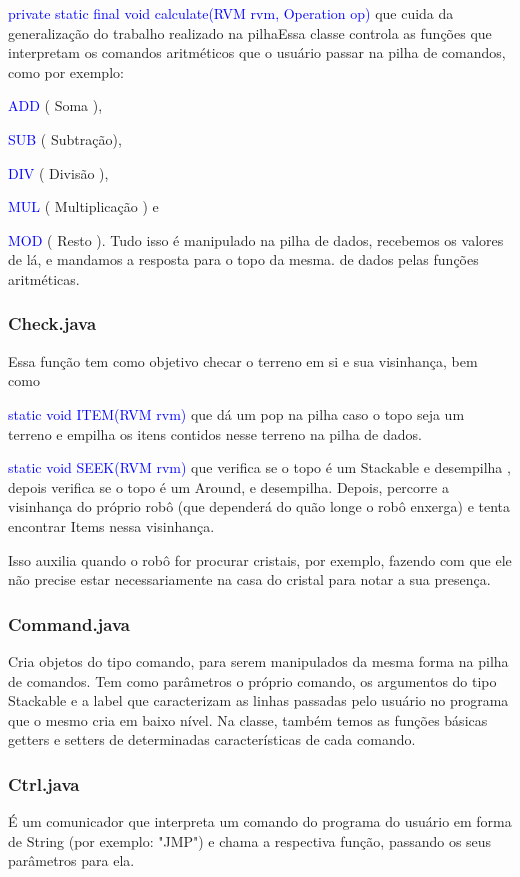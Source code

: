 \documentclass[a4paper]{article}
\begin{document}
		    {\textcolor{blue}{ private static final void 
		    calculate(RVM rvm, Operation op) }
		    que cuida da generalização do trabalho realizado 
		    na pilhaEssa classe controla as funções que interpretam
		    os comandos aritméticos que o usuário passar na
		    pilha de comandos, como por exemplo: 
		    {\textcolor{blue}{ADD} ( Soma ),
		    {\textcolor{blue}{SUB} ( Subtração),
		    {\textcolor{blue}{DIV} ( Divisão ), 
		    {\textcolor{blue}{MUL} ( Multiplicação ) e 
		    {\textcolor{blue}{MOD} ( Resto ).
		    Tudo isso é manipulado na pilha de dados,
		    recebemos os valores de lá, e mandamos a resposta
		    para o topo da mesma. de dados pelas funções aritméticas.
		        
		\subsubsection{ Check.java }
		    Essa função tem como objetivo checar o terreno em
		    si e sua visinhança, bem como 
		    
		    {\textcolor{blue}{  static void ITEM(RVM rvm) }
		    que dá um pop na pilha caso o topo seja um terreno
		    e empilha os itens contidos nesse terreno na pilha
		    de dados.
		    
		    {\textcolor{blue}{  static void SEEK(RVM rvm) }
		    que verifica se o topo é um Stackable e desempilha
		    , depois verifica se o topo é um Around, e desempilha.
		    Depois, percorre a visinhança do próprio robô 
		    (que dependerá do quão longe o robô enxerga)
		    e tenta encontrar Items nessa visinhança.
		    
		    Isso auxilia quando o robô for procurar cristais,
		    por exemplo, fazendo com que ele não precise estar
		    necessariamente na casa do cristal para notar a 
		    sua presença.
		    
		\subsubsection{ Command.java }
		    Cria objetos do tipo comando, para serem manipulados
		    da mesma forma na pilha de comandos.
		    Tem como parâmetros o próprio comando, os argumentos
		    do tipo Stackable e a label que caracterizam as linhas
		    passadas pelo usuário no programa que o mesmo cria em
		    baixo nível.
		    Na classe, também temos as funções básicas getters e
		    setters de determinadas características de cada
		    comando.
		    
		\subsubsection{ Ctrl.java }
		    É um comunicador que interpreta um comando do programa
		    do usuário em forma de String (por exemplo: "JMP") e 
		    chama a respectiva função, passando os seus parâmetros 
		    para ela.
		    
}}}}}}}}
\end{document}
